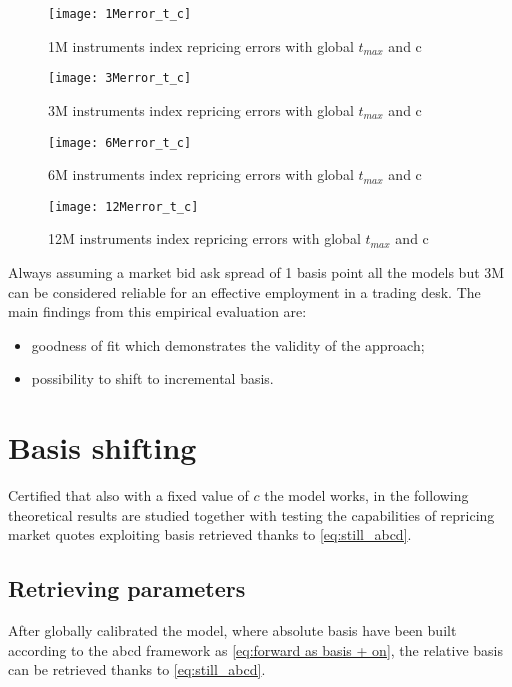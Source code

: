\begin{figure}[H]
\centering
\texttt{[image: 1Merror\_t\_c]}
\caption{1M instruments index repricing errors with global $t_{max}$ and c}
\label{fig:1Merror_t_c}
\end{figure}

\begin{figure}[H]
\centering
\texttt{[image: 3Merror\_t\_c]}
\caption{3M instruments index repricing errors with global $t_{max}$ and c}
\label{fig:3Merror_t_c}
\end{figure}

\begin{figure}[H]
\centering
\texttt{[image: 6Merror\_t\_c]}
\caption{6M instruments index repricing errors with global $t_{max}$ and c}
\label{fig:6Merror_t_c}
\end{figure}

\begin{figure}[H]
\centering
\texttt{[image: 12Merror\_t\_c]}
\caption{12M instruments index repricing errors with global $t_{max}$ and c}
\label{fig:12Merror_t_c}
\end{figure}

Always assuming a market bid ask spread of 1 basis point all the models but 3M can be considered reliable for an effective employment in a trading desk.
The main findings from this empirical evaluation are:

\begin{itemize}
    \item goodness of fit which demonstrates the validity of the approach;
    \item possibility to shift to incremental basis.
\end{itemize}


\section{Basis shifting}


Certified that also with a fixed value of $c$ the model works, in the following theoretical results are studied together with testing the capabilities of repricing market quotes exploiting basis retrieved thanks to \eqref{eq:still_abcd}.

\subsection{Retrieving parameters}

After globally calibrated the model, where absolute basis have been built according to the abcd framework as \eqref{eq:forward as basis + on}, the relative basis can be retrieved thanks to \eqref{eq:still_abcd}.

